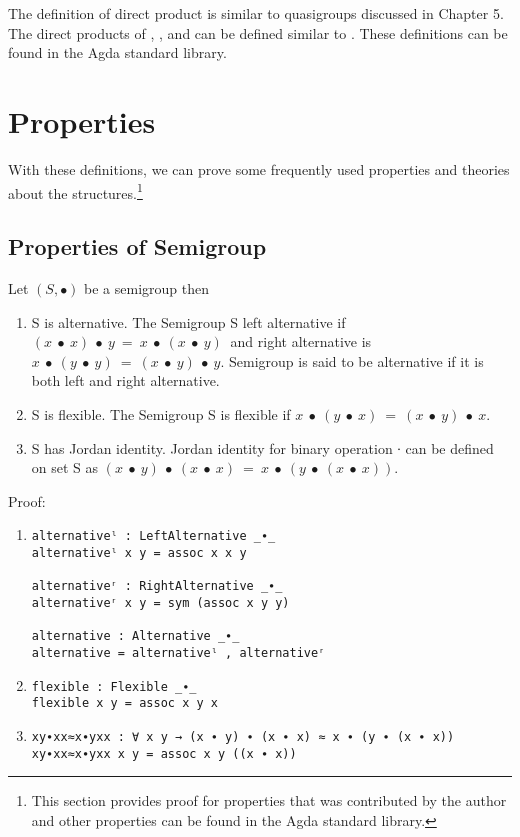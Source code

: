 The definition of direct product is similar to quasigroups discussed in Chapter
5. The direct products of , , and
 can be defined similar to . These
definitions can be found in the Agda standard library.

\section{Properties}
With these definitions, we can prove some frequently used properties and theories
about the structures.\footnote{This section provides proof for properties that
was contributed by the author and other properties can be found in the Agda standard
library.}
\subsection{Properties of Semigroup}
Let $(S, ∙)$ be a semigroup then
\begin{enumerate}
\item S is alternative. The Semigroup S left alternative if \((x\ ∙\ x)\ ∙\ y\ =\ x\ ∙\ (x\ ∙\ y)\ \) and right alternative is
\(x\ ∙\ (y\ ∙\ y)\ =\ (x\ ∙\ y)\ ∙\ y\). Semigroup is
said to be alternative if it is both left and right alternative. 
\item S is flexible. The Semigroup S is flexible if \(x\ ∙\ (y\
∙\ x)\ =\ (x\ ∙\ y)\ ∙\ x\).
\item S has Jordan identity.  Jordan identity for binary operation ∙ can be
defined on set S as \((x\ ∙\ y)\ ∙\ (x\ ∙\ x)\ =\
x\ ∙\ (y\ ∙\ (x\ ∙\ x)). \)
\end{enumerate}
Proof:
\begin{enumerate}
\item
\begin{verbatim}
alternativeˡ : LeftAlternative _∙_
alternativeˡ x y = assoc x x y

alternativeʳ : RightAlternative _∙_
alternativeʳ x y = sym (assoc x y y)

alternative : Alternative _∙_
alternative = alternativeˡ , alternativeʳ
\end{verbatim}
 \item
\begin{verbatim}
flexible : Flexible _∙_
flexible x y = assoc x y x
\end{verbatim}
\item
\begin{verbatim}
xy∙xx≈x∙yxx : ∀ x y → (x ∙ y) ∙ (x ∙ x) ≈ x ∙ (y ∙ (x ∙ x))
xy∙xx≈x∙yxx x y = assoc x y ((x ∙ x))
\end{verbatim}
\end{enumerate}
